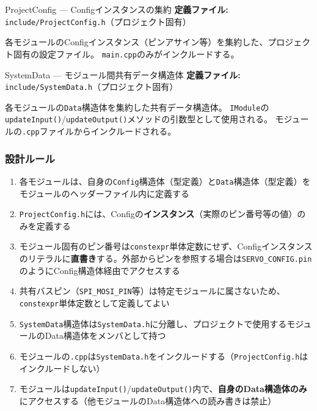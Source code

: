 \begin{apibox}{ProjectConfig — Configインスタンスの集約}
\textbf{定義ファイル:} \texttt{include/ProjectConfig.h}（プロジェクト固有）

各モジュールのConfigインスタンス（ピンアサイン等）を集約した、プロジェクト固有の設定ファイル。
\texttt{main.cpp}のみがインクルードする。
\end{apibox}

\begin{apibox}{SystemData — モジュール間共有データ構造体}
\textbf{定義ファイル:} \texttt{include/SystemData.h}（プロジェクト固有）

各モジュールの\texttt{Data}構造体を集約した共有データ構造体。
\texttt{IModule}の\texttt{updateInput()}/\texttt{updateOutput()}メソッドの引数型として使用される。
モジュールの\texttt{.cpp}ファイルからインクルードされる。
\end{apibox}

\subsubsection{設計ルール}

\begin{enumerate}
    \item 各モジュールは、自身の\texttt{Config}構造体（型定義）と\texttt{Data}構造体（型定義）をモジュールのヘッダーファイル内に定義する
    \item \texttt{ProjectConfig.h}には、Configの\textbf{インスタンス}（実際のピン番号等の値）のみを定義する
    \item モジュール固有のピン番号は\texttt{constexpr}単体定数にせず、Configインスタンスのリテラルに\textbf{直書き}する。外部からピンを参照する場合は\texttt{SERVO\_CONFIG.pin}のようにConfig構造体経由でアクセスする
    \item 共有バスピン（\texttt{SPI\_MOSI\_PIN}等）は特定モジュールに属さないため、\texttt{constexpr}単体定数として定義してよい
    \item \texttt{SystemData}構造体は\texttt{SystemData.h}に分離し、プロジェクトで使用するモジュールのData構造体をメンバとして持つ
    \item モジュールの\texttt{.cpp}は\texttt{SystemData.h}をインクルードする（\texttt{ProjectConfig.h}はインクルードしない）
    \item モジュールは\texttt{updateInput()}/\texttt{updateOutput()}内で、\textbf{自身のData構造体のみ}にアクセスする（他モジュールのData構造体への読み書きは禁止）
\end{enumerate}

